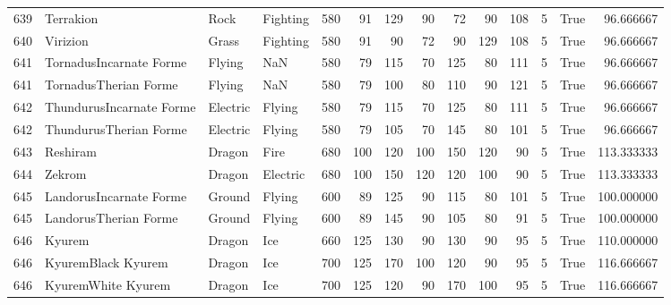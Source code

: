 \begin{tabular}{rlllrrrrrrrrlr}
 639 &                  Terrakion &      Rock &  Fighting &    580 &   91 &     129 &       90 &       72 &       90 &    108 &           5 &       True &   96.666667 \\
 640 &                   Virizion &     Grass &  Fighting &    580 &   91 &      90 &       72 &       90 &      129 &    108 &           5 &       True &   96.666667 \\
 641 &    TornadusIncarnate Forme &    Flying &       NaN &    580 &   79 &     115 &       70 &      125 &       80 &    111 &           5 &       True &   96.666667 \\
 641 &      TornadusTherian Forme &    Flying &       NaN &    580 &   79 &     100 &       80 &      110 &       90 &    121 &           5 &       True &   96.666667 \\
 642 &   ThundurusIncarnate Forme &  Electric &    Flying &    580 &   79 &     115 &       70 &      125 &       80 &    111 &           5 &       True &   96.666667 \\
 642 &     ThundurusTherian Forme &  Electric &    Flying &    580 &   79 &     105 &       70 &      145 &       80 &    101 &           5 &       True &   96.666667 \\
 643 &                   Reshiram &    Dragon &      Fire &    680 &  100 &     120 &      100 &      150 &      120 &     90 &           5 &       True &  113.333333 \\
 644 &                     Zekrom &    Dragon &  Electric &    680 &  100 &     150 &      120 &      120 &      100 &     90 &           5 &       True &  113.333333 \\
 645 &    LandorusIncarnate Forme &    Ground &    Flying &    600 &   89 &     125 &       90 &      115 &       80 &    101 &           5 &       True &  100.000000 \\
 645 &      LandorusTherian Forme &    Ground &    Flying &    600 &   89 &     145 &       90 &      105 &       80 &     91 &           5 &       True &  100.000000 \\
 646 &                     Kyurem &    Dragon &       Ice &    660 &  125 &     130 &       90 &      130 &       90 &     95 &           5 &       True &  110.000000 \\
 646 &         KyuremBlack Kyurem &    Dragon &       Ice &    700 &  125 &     170 &      100 &      120 &       90 &     95 &           5 &       True &  116.666667 \\
 646 &         KyuremWhite Kyurem &    Dragon &       Ice &    700 &  125 &     120 &       90 &      170 &      100 &     95 &           5 &       True &  116.666667 \\

\end{tabular}
